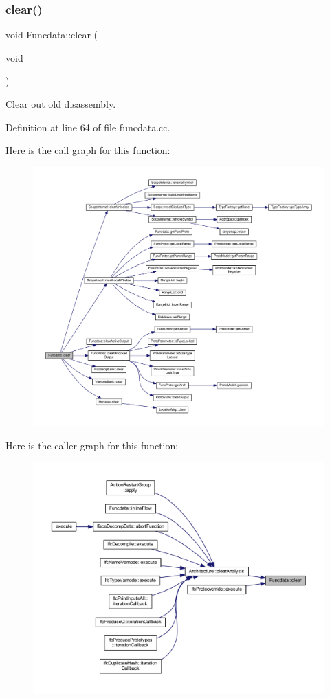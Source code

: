 \subsubsection{\texorpdfstring{clear()}{clear()}}
{\footnotesize\ttfamily void Funcdata\+::clear (\begin{DoxyParamCaption}\item[{void}]{ }\end{DoxyParamCaption})}



Clear out old disassembly. 



Definition at line 64 of file funcdata.\+cc.

Here is the call graph for this function\+:
\nopagebreak
\begin{figure}[H]
\begin{center}
\leavevmode
\includegraphics[width=350pt]{class_funcdata_a25b616d10d9514eda69dd9d974c62eb8_cgraph}
\end{center}
\end{figure}
Here is the caller graph for this function\+:
\nopagebreak
\begin{figure}[H]
\begin{center}
\leavevmode
\includegraphics[width=350pt]{class_funcdata_a25b616d10d9514eda69dd9d974c62eb8_icgraph}
\end{center}
\end{figure}

